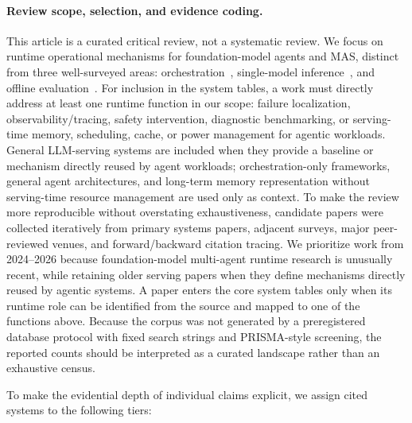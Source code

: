 \paragraph*{Review scope, selection, and evidence coding.} This article is a curated critical review, not a systematic review. We focus on runtime operational mechanisms for foundation-model agents and MAS, distinct from three well-surveyed areas: orchestration~\cite{zhu2026orchestration}, single-model inference~\cite{kwon2023}, and offline evaluation~\cite{evalbenchmark2025}. For inclusion in the system tables, a work must directly address at least one runtime function in our scope: failure localization, observability/tracing, safety intervention, diagnostic benchmarking, or serving-time memory, scheduling, cache, or power management for agentic workloads. General LLM-serving systems are included when they provide a baseline or mechanism directly reused by agent workloads; orchestration-only frameworks, general agent architectures, and long-term memory representation without serving-time resource management are used only as context. To make the review more reproducible without overstating exhaustiveness, candidate papers were collected iteratively from primary systems papers, adjacent surveys, major peer-reviewed venues, and forward/backward citation tracing. We prioritize work from 2024--2026 because foundation-model multi-agent runtime research is unusually recent, while retaining older serving papers when they define mechanisms directly reused by agentic systems. A paper enters the core system tables only when its runtime role can be identified from the source and mapped to one of the functions above. Because the corpus was not generated by a preregistered database protocol with fixed search strings and PRISMA-style screening, the reported counts should be interpreted as a curated landscape rather than an exhaustive census.

To make the evidential depth of individual claims explicit, we assign cited systems to the following tiers:

